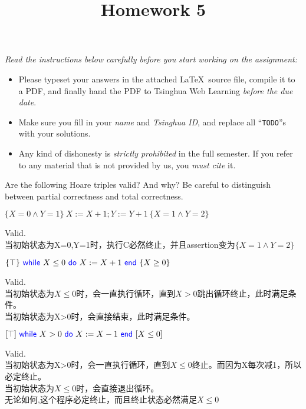 \documentclass[11pt,a4paper]{article}
\title{Homework 5}
\newcommand{\kword}[1]{{\color{blue} \textsf{#1}}}
\newcommand{\While}{\kword{while}}
\newcommand{\Do}{\kword{do}}
\newcommand{\End}{\kword{end}}
\begin{document}
\maketitle

\textit{Read the instructions below carefully before you start working on the assignment:}
\begin{itemize}
    \item Please typeset your answers in the attached \LaTeX~source file, compile it to a PDF,
    and finally hand the PDF to Tsinghua Web Learning \emph{before the due date}.
    \item Make sure you fill in your \emph{name} and \emph{Tsinghua ID},
    and replace all ``\texttt{TODO}''s with your solutions.
    \item Any kind of dishonesty is \emph{strictly prohibited} in the full semester.
    If you refer to any material that is not provided by us, you \emph{must cite} it.
\end{itemize}


Are the following Hoare triples valid? And why?
Be careful to distinguish between partial correctness and total correctness.

\subproblem $\{X = 0 \land Y = 1\}~X := X + 1; Y := Y + 1~\{X = 1 \land Y = 2\}$

\begin{solution}
    Valid.\\
    当初始状态为X=0,Y=1时，执行C必然终止，并且assertion变为$\{X = 1 \land Y = 2\}$
\end{solution}

\subproblem $\{\top\}~\While~X \le 0~\Do~X := X + 1~\End~\{X \ge 0\}$

\begin{solution}
    Valid.\\
    当初始状态为$X \leq 0$时，会一直执行循环，直到$X > 0$跳出循环终止，此时满足条件。\\
    当初始状态为X>0时，会直接结束，此时满足条件。
\end{solution}

\subproblem $[\top]~\While~X > 0~\Do~X := X - 1~\End~[X \le 0]$

\begin{solution}
    Valid.\\
    当初始状态为X>0时，会一直执行循环，直到$X \leq 0$终止。而因为X每次减1，所以必定终止。\\
    当初始状态为$X \leq 0$时，会直接退出循环。\\
    无论如何,这个程序必定终止，而且终止状态必然满足$X \leq 0$
\end{solution}
\end{document}
